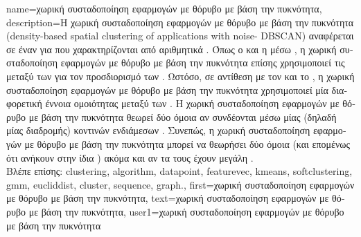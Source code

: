 {name={\foreignlanguage{greek}{χωρική συσταδοποίηση εφαρμογών με θόρυβο με βάση την πυκνότητα}}, 
	description={\foreignlanguage{greek}{Η χωρική συσταδοποίηση εφαρμογών με θόρυβο με βάση την 
		πυκνότητα} 
		(density-based spatial clustering of applications with noise\linebreak - DBSCAN) \foreignlanguage{greek}{αναφέρεται σε έναν} 
		  \foreignlanguage{greek}{για}  \foreignlanguage{greek}{που 
		χαρακτηρίζονται από αριθμητικά} . \foreignlanguage{greek}{Όπως ο}  
		\foreignlanguage{greek}{και η}  
		\foreignlanguage{greek}{μέσω} , \foreignlanguage{greek}{η χωρική συσταδοποίηση εφαρμογών με θόρυβο με βάση την 
		πυκνότητα επίσης χρησιμοποιεί τις}  \foreignlanguage{greek}{μεταξύ των}  
		\foreignlanguage{greek}{για τον προσδιορισμό των} . \foreignlanguage{greek}{Ωστόσο, σε αντίθεση με τον}  
		 \foreignlanguage{greek}{και το} , \foreignlanguage{greek}{η χωρική συσταδοποίηση εφαρμογών με 
		θόρυβο με βάση την πυκνότητα χρησιμοποιεί μία διαφορετική έννοια ομοιότητας μεταξύ των} . 
		\foreignlanguage{greek}{Η χωρική συσταδοποίηση εφαρμογών με θόρυβο με βάση την πυκνότητα θεωρεί δύο}  
		\foreignlanguage{greek}{όμοια αν συνδέονται μέσω μίας}  \foreignlanguage{greek}{(δηλαδή μίας διαδρομής) 
		κοντινών ενδιάμεσων} . \foreignlanguage{greek}{Συνεπώς, η χωρική συσταδοποίηση εφαρμογών με θόρυβο 
		με βάση την πυκνότητα μπορεί να θεωρήσει δύο}  \foreignlanguage{greek}{όμοια (και επομένως ότι ανήκουν 
		στην ίδια} ) \foreignlanguage{greek}{ακόμα και αν τα}  \foreignlanguage{greek}{τους έχουν 
		μεγάλη} .
				\\
		\foreignlanguage{greek}{Βλέπε επίσης:} \gls{clustering}, \gls{algorithm}, \gls{datapoint}, \gls{featurevec}, \gls{kmeans}, 
		\gls{softclustering}, \gls{gmm}, \gls{eucliddist}, \gls{cluster}, \gls{sequence}, \gls{graph}.},
	first={\foreignlanguage{greek}{χωρική συσταδοποίηση εφαρμογών με θόρυβο με βάση την πυκνότητα}},
	text={\foreignlanguage{greek}{χωρική συσταδοποίηση εφαρμογών με θόρυβο με βάση την πυκνότητα}},
	user1={\foreignlanguage{greek}{χωρική συσταδοποίηση εφαρμογών με θόρυβο με βάση την πυκνότητα}} %
}

